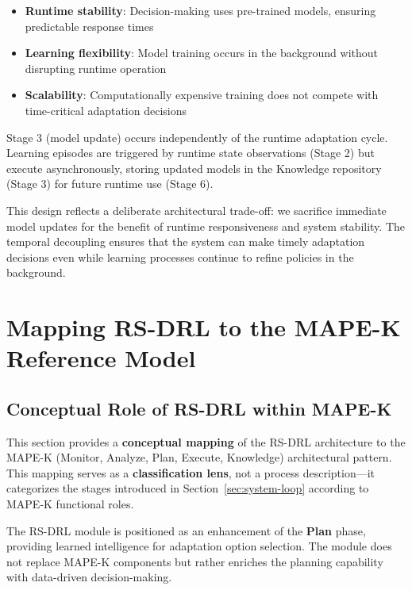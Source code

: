 \documentclass[11pt,a4paper]{article}
\begin{document}
\begin{itemize}
    \item \textbf{Runtime stability}: Decision-making uses pre-trained models, ensuring predictable response times
    \item \textbf{Learning flexibility}: Model training occurs in the background without disrupting runtime operation
    \item \textbf{Scalability}: Computationally expensive training does not compete with time-critical adaptation decisions
\end{itemize}

Stage 3 (model update) occurs independently of the runtime adaptation cycle. Learning episodes are triggered by runtime state observations (Stage 2) but execute asynchronously, storing updated models in the Knowledge repository (Stage 3) for future runtime use (Stage 6).

This design reflects a deliberate architectural trade-off: we sacrifice immediate model updates for the benefit of runtime responsiveness and system stability. The temporal decoupling ensures that the system can make timely adaptation decisions even while learning processes continue to refine policies in the background.


\section{Mapping RS-DRL to the MAPE-K Reference Model}
\label{sec:mape-k-mapping}

\subsection{Conceptual Role of RS-DRL within MAPE-K}
\label{subsec:rs-drl-role}

This section provides a \textbf{conceptual mapping} of the RS-DRL architecture to the MAPE-K (Monitor, Analyze, Plan, Execute, Knowledge) architectural pattern. This mapping serves as a \textbf{classification lens}, not a process description---it categorizes the stages introduced in Section~\ref{sec:system-loop} according to MAPE-K functional roles.

The RS-DRL module is positioned as an enhancement of the \textbf{Plan} phase, providing learned intelligence for adaptation option selection. The module does not replace MAPE-K components but rather enriches the planning capability with data-driven decision-making.
\end{document}
